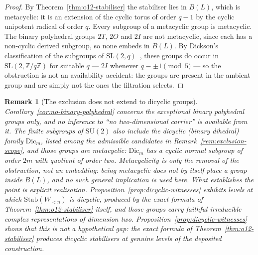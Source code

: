 \documentclass[11pt,a4paper]{article}
\newtheorem{remark}[theorem]{Remark}
\newcommand{\SU}{\mathrm{SU}}
\newcommand{\SL}{\mathrm{SL}}
\begin{document}
    \begin{proof}
      By Theorem~\ref{thm:o12-stabiliser} the stabiliser lies in $B(L)$, which is metacyclic:
      it is an extension of the cyclic torus of order $q-1$ by the cyclic unipotent radical of
      order $q$.
      Every subgroup of a metacyclic group is metacyclic.
      The binary polyhedral groups $2T$, $2O$ and $2I$ are not metacyclic, since each has a
      non-cyclic derived subgroup, so none embeds in $B(L)$.
      By Dickson's classification of the subgroups of $\SL(2,q)$~\cite{Dickson1901}, these
      groups do occur in $\SL(2,\mathbb{Z}/q\mathbb{Z})$ for suitable $q$ --- $2I$ whenever
      $q \equiv \pm 1 \pmod{5}$ --- so the obstruction is not an availability accident:
      the groups are present in the ambient group and are simply not the ones the filtration
      selects.
    \end{proof}

    \begin{remark}[The exclusion does not extend to dicyclic groups]
      \label{rem:dicyclic-not-excluded}
      Corollary~\ref{cor:no-binary-polyhedral} concerns the \emph{exceptional} binary polyhedral
      groups only, and no inference to ``no two-dimensional carrier'' is available from it.
      The finite subgroups of $\SU(2)$ also include the dicyclic (binary dihedral) family
      $\mathrm{Dic}_{m}$, listed among the admissible candidates in
      Remark~\ref{rem:exclusion-scope}, and those groups \emph{are} metacyclic: $\mathrm{Dic}_{m}$
      has a cyclic normal subgroup of order $2m$ with quotient of order two.
      Metacyclicity is only the removal of the obstruction, not an embedding: being metacyclic
      does not by itself place a group inside $B(L)$, and no such general implication is used
      here.
      What establishes the point is explicit realisation.
      Proposition~\ref{prop:dicyclic-witnesses} exhibits levels at which
      $\mathrm{Stab}(W_{<n})$ \emph{is} dicyclic, produced by the exact formula of
      Theorem~\ref{thm:o12-stabiliser} itself, and those groups carry faithful irreducible
      complex representations of dimension two.
      Proposition~\ref{prop:dicyclic-witnesses} shows that this is not a hypothetical gap:
      the exact formula of Theorem~\ref{thm:o12-stabiliser} produces dicyclic stabilisers at
      genuine levels of the deposited construction.
    \end{remark}
\end{document}
